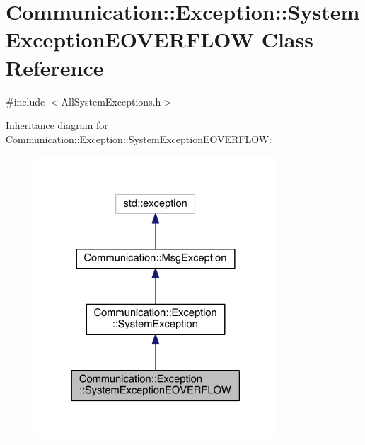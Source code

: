 \hypertarget{class_communication_1_1_exception_1_1_system_exception_e_o_v_e_r_f_l_o_w}{}\section{Communication\+:\+:Exception\+:\+:System\+Exception\+E\+O\+V\+E\+R\+F\+L\+O\+W Class Reference}
\label{class_communication_1_1_exception_1_1_system_exception_e_o_v_e_r_f_l_o_w}


{\ttfamily \#include $<$All\+System\+Exceptions.\+h$>$}



Inheritance diagram for Communication\+:\+:Exception\+:\+:System\+Exception\+E\+O\+V\+E\+R\+F\+L\+O\+W\+:\nopagebreak
\begin{figure}[H]
\begin{center}
\leavevmode
\includegraphics[width=258pt]{class_communication_1_1_exception_1_1_system_exception_e_o_v_e_r_f_l_o_w__inherit__graph}
\end{center}
\end{figure}


